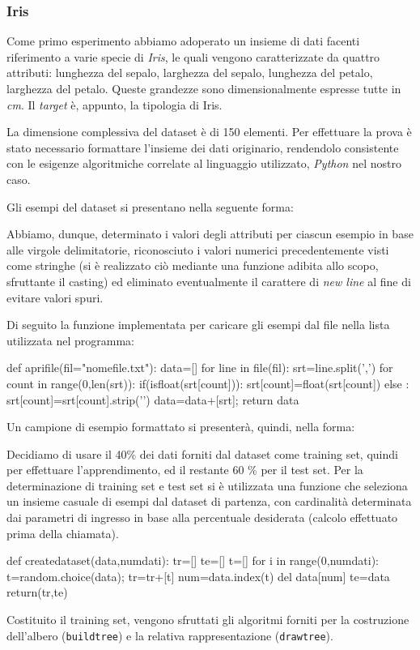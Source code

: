 		\subsubsection{Iris}
			Come primo esperimento abbiamo adoperato un insieme di dati facenti riferimento a varie specie di \emph{Iris}, le quali vengono caratterizzate da quattro attributi: lunghezza del sepalo, larghezza del sepalo, lunghezza del petalo, larghezza del petalo. Queste grandezze sono dimensionalmente espresse tutte in \emph{cm}. Il \emph{target} è, appunto, la tipologia di Iris.\par
			La dimensione complessiva del dataset è di 150 elementi. Per effettuare la prova è stato necessario formattare l'insieme dei dati originario, rendendolo consistente con le esigenze algoritmiche correlate al linguaggio utilizzato, \emph{Python} nel nostro caso.\par
			Gli esempi del dataset si presentano nella seguente forma:
			
			Abbiamo, dunque, determinato i valori degli attributi per ciascun esempio in base alle virgole delimitatorie, riconosciuto i valori numerici precedentemente visti come stringhe (si è realizzato ciò mediante una funzione adibita allo scopo, sfruttante il casting) ed eliminato eventualmente il carattere di \textit{new line} al fine di evitare valori spuri.\par
			Di seguito la funzione implementata per caricare gli esempi dal file nella lista utilizzata nel programma:
			\medskip
			\begin{python}
		def aprifile(fil="nomefile.txt"):
			data=[]
			for line in file(fil):
				srt=line.split(',')
				for count in range(0,len(srt)):
					if(isfloat(srt[count])):
						srt[count]=float(srt[count])
					else :
						srt[count]=srt[count].strip('\n')
				data=data+[srt];
			return data
			\end{python}
			\bigskip
			Un campione di esempio formattato si presenterà, quindi, nella forma:
			
		
			Decidiamo di usare il 40\% dei dati forniti dal dataset come training set, quindi per effettuare l'apprendimento, ed il restante 60 \% per il test set. Per la determinazione di training set e test set si è utilizzata una funzione che seleziona un insieme casuale di esempi dal dataset di partenza, con cardinalità determinata dai parametri di ingresso in base alla percentuale desiderata (calcolo effettuato prima della chiamata).
			\bigskip
			\begin{python}
		def createdataset(data,numdati):
			tr=[]
			te=[]
			t=[]
			for i in range(0,numdati):
				t=random.choice(data);
				tr=tr+[t]
				num=data.index(t)
				del data[num]
			te=data
			return(tr,te)
			\end{python}
			\bigskip
			Costituito il training set, vengono sfruttati gli algoritmi forniti per la costruzione dell'albero (\texttt{buildtree}) e la relativa rappresentazione (\texttt{drawtree}).
		
